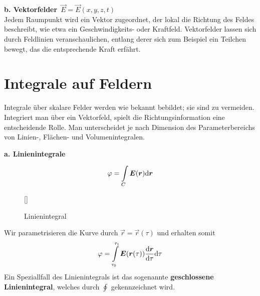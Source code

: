 \textbf{b. Vektorfelder}\ $\vec{E}=\vec{E}(x,y,z,t)$\\

Jedem Raumpunkt wird ein Vektor zugeordnet, der lokal die Richtung des Feldes beschreibt, wie etwa ein Geschwindigkeits- oder Kraftfeld. Vektorfelder lassen sich durch Feldlinien veranschaulichen, entlang derer sich zum Beispiel ein Teilchen bewegt, das die entsprechende Kraft erfährt.


\section{Integrale auf Feldern}
Integrale über skalare Felder werden wie bekannt bebildet; sie sind zu vermeiden.\\
Integriert man über ein Vektorfeld, spielt die Richtungsinformation eine entscheidende Rolle. Man unterscheidet je nach Dimension des Parameterbereichs von Linien-, Flächen- und Volumenintegralen.\\
\linebreak


\textbf{a. Linienintegrale}

\begin{equation*}
\varphi=\int\limits_{C}\bm{E}(\bm{r})\mathrm{d}\bm{r}
\end{equation*}

\begin{wrapfigure}[]{r}[0cm]{0cm}
	\raisebox{0pt}[\dimexpr{}\baselineskip\relax]{
		\colorbox{hgrey}{
		}
	}
	\caption{Linienintegral}
\end{wrapfigure}
Wir parametrisieren die Kurve durch $\vec{r}=\vec{r}(\tau)$ und erhalten somit
\begin{equation*}
\varphi=\int\limits_{\tau_0}^{\tau_1}\bm{E}(\bm{r}(\tau))\frac{\mathrm{d}{\bm{r}}}{\mathrm{d}{\tau}}\mathrm{d} \tau
\end{equation*}
Ein Speziallfall des Linienintegrals ist das sogenannte \textbf{geschlossene Linienintegral}, welches durch $\oint$ gekennzeichnet wird.\\
\linebreak


